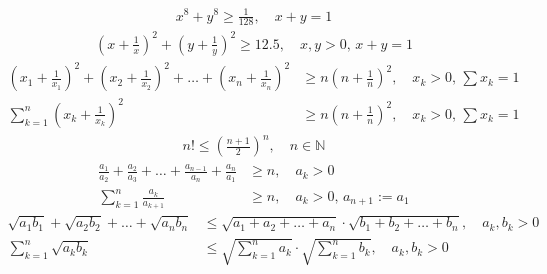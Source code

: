 \documentclass[a4paper,11pt]{article}
\begin{document}
\vspace{13pt}
\begin{equation}
    \begin{aligned}
        x^8+y^8 \geq \frac{1}{128}, \quad x+y=1
    \end{aligned}
\end{equation}
\vspace{13pt}
\begin{equation}
    \begin{aligned}
        \left(x+\frac{1}{x}\right)^2 + \left(y+\frac{1}{y}\right)^2 \geq 12.5, \quad x,y>0,\,x+y=1
    \end{aligned}
\end{equation}
\vspace{13pt}
\begin{equation}
    \begin{aligned}
        \left(x_1+\frac{1}{x_1}\right)^2 + \left(x_2+\frac{1}{x_2}\right)^2 + \dots + \left(x_n+\frac{1}{x_n}\right)^2 &\geq n\left(n+\frac{1}{n}\right)^2, \quad x_k>0,\,\sum x_k=1 \\
        \sum_{k=1}^n \left(x_k+\frac{1}{x_k}\right)^2 &\geq n\left(n+\frac{1}{n}\right)^2, \quad x_k>0,\,\sum x_k=1
    \end{aligned}
\end{equation}
\vspace{13pt}
\begin{equation}
    \begin{aligned}
        n! \leq \left(\frac{n+1}{2}\right)^n, \quad n\in\mathbb{N}
    \end{aligned}
\end{equation}
\vspace{13pt}
\begin{equation}
    \begin{aligned}
        \frac{a_1}{a_2} + \frac{a_2}{a_3} + \dots + \frac{a_{n-1}}{a_n} + \frac{a_n}{a_1} &\geq n, \quad a_k>0 \\
        \sum_{k=1}^n \frac{a_k}{a_{k+1}} &\geq n, \quad a_k>0,\,a_{n+1}:=a_1
    \end{aligned}
\end{equation}
\vspace{13pt}
\begin{equation}
    \begin{aligned}
        \sqrt{a_1b_1} + \sqrt{a_2b_2} + \dots + \sqrt{a_nb_n} &\leq \sqrt{a_1+a_2+\dots+a_n}\cdot\sqrt{b_1+b_2+\dots+b_n}, \quad a_k,b_k>0 \\
        \sum_{k=1}^n \sqrt{a_k b_k} &\leq \sqrt{\sum_{k=1}^n a_k} \cdot \sqrt{\sum_{k=1}^n b_k}, \quad a_k,b_k>0
    \end{aligned}
\end{equation}
\end{document}
